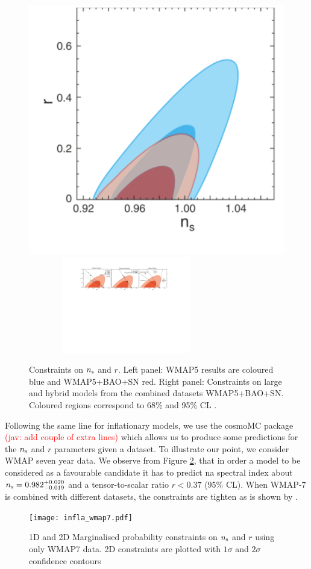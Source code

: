 \documentclass{rmaa}
\newcommand{\jav}[1]{\textcolor{red}{(jav: #1)}}
\begin{document}
\begin{figure}[t!]
\begin{center}
 \includegraphics[trim = 1mm 10mm -2mm -10mm, clip, width=3.cm, height=4.cm]{komatsu1.pdf}
  \includegraphics[trim = 0mm 0mm 2mm 0mm, clip, width=8.6cm, height=4.2cm]{komat.pdf} 
\caption{Constraints on $n_{\rm s}$ and $r$.
Left panel: WMAP5 results are coloured blue and WMAP5+BAO+SN red.
Right panel: Constraints on large and hybrid models from the combined datasets WMAP5+BAO+SN.
Coloured regions correspond to 68\% and 95\% CL
 \citep{Komatsu}.}\label{fig:Komatsu}
\end{center}
\end{figure}

Following the same line for inflationary models, we use the {\sc cosmoMC} package \citep{Lewis} \jav{add couple of extra lines}
which allows us to produce some predictions for the $n_{\rm s}$ and $r$ parameters given 
a dataset. To illustrate our point, we consider WMAP seven year data. 
We observe from Figure \ref{fig:infla}, that in order a 
model to be considered as a favourable candidate 
it has to predict na spectral index about  $n_{\rm s}=0.982^{+0.020}_{-0.019}$ 
 and a tensor-to-scalar ratio $r<0.37$ (95\% CL).
When WMAP-7 is combined with different datasets, the constraints are tighten as is 
shown by \citet{Larson}. 



\begin{figure}[h!]
\begin{center}
 \texttt{[image: infla\_wmap7.pdf]}
\caption{1D and 2D Marginalised probability constraints on $n_{\rm s}$ and $r$ using only WMAP7 data. 
2D constraints are plotted with $1\sigma$ and
$2\sigma$ confidence contours
}\label{fig:infla}
\end{center}
\end{figure}	
\end{document}
